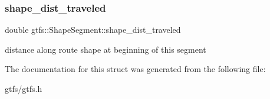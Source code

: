 \subsubsection{\texorpdfstring{shape\+\_\+dist\+\_\+traveled}{shape\_dist\_traveled}}
{\footnotesize\ttfamily double gtfs\+::\+Shape\+Segment\+::shape\+\_\+dist\+\_\+traveled}

distance along route shape at beginning of this segment 

The documentation for this struct was generated from the following file\+:\begin{DoxyCompactItemize}
\item 
gtfs/gtfs.\+h\end{DoxyCompactItemize}
